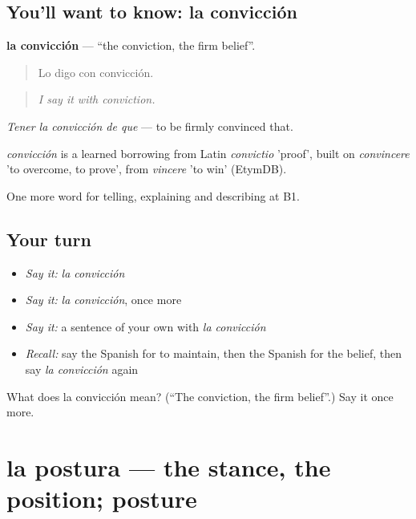 \subsection*{You'll want to know: la convicción}
\textbf{la convicción} — \textquotedblleft{}the conviction, the firm belief\textquotedblright{}.

\begin{quote}
Lo digo con convicción.
\end{quote}

\begin{quote}
\emph{I say it with conviction.}
\end{quote}

\emph{Tener la convicción de que} — to be firmly convinced that.

\begin{cousinweb}
\emph{convicción} is a learned borrowing from Latin \emph{convictio} 'proof', built on \emph{convincere} 'to overcome, to prove', from \emph{vincere} 'to win' (EtymDB).
\end{cousinweb}

\begin{grammarlens}[title={What you've built}]
One more word for telling, explaining and describing at B1.
\end{grammarlens}

\subsection*{Your turn}
\begin{itemize}
\raggedright
  \item \emph{Say it:} \emph{la convicción}
  \item \emph{Say it:} \emph{la convicción}, once more
  \item \emph{Say it:} a sentence of your own with \emph{la convicción}
  \item \emph{Recall:} say the Spanish for to maintain, then the Spanish for the belief, then say \emph{la convicción} again
\end{itemize}

\begin{tcolorbox}[breakable,colback=teal!4,colframe=teal!35!black,title={Before you move on}]
What does la convicción mean? (\textquotedblleft{}The conviction, the firm belief\textquotedblright{}.) Say it once more.
\end{tcolorbox}
\section[la postura]{la postura — the stance, the position; posture}

